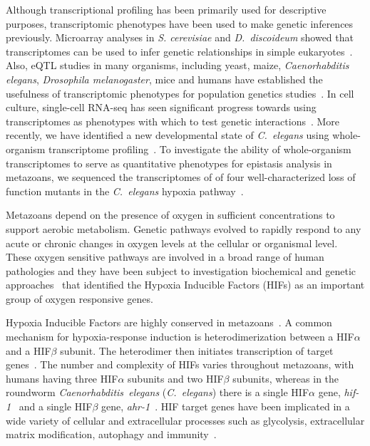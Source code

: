 \documentclass[9pt,twocolumn,twoside]{pnas-new}
\newcommand{\cel}{\emph{C.~elegans}}
\newcommand{\dicty}{\emph{D.~discoideum}}
\newcommand{\gene}[1]{\emph{#1}}
\begin{document}
Although transcriptional profiling has been primarily used for descriptive purposes,
transcriptomic phenotypes have been used to make genetic inferences previously.
Microarray analyses in \emph{S. cerevisiae} and \dicty{} showed
that transcriptomes can be used to infer genetic relationships in simple
eukaryotes~\cite{Hughes2000, VanDriessche2005}. Also, eQTL studies in
many organisms, including yeast, maize, \emph{Caenorhabditis elegans},
\emph{Drosophila melanogaster}, mice and humans have established the usefulness of
transcriptomic phenotypes for population genetics studies~\cite{Brem2002,Schadt2003,
Li2006,King2014}. In cell culture, single-cell RNA-seq has seen significant
progress towards using transcriptomes as phenotypes with which to test genetic
interactions~\cite{Adamson2016,Dixit2016}.
More recently, we have identified a new developmental state
of \cel{} using whole-organism transcriptome profiling~\cite{Angeles-Albores2016a}.
To investigate the ability of whole-organism transcriptomes to serve as quantitative
phenotypes for epistasis analysis in metazoans, we sequenced the transcriptomes of
of four well-characterized loss of function mutants in the \cel{} hypoxia
pathway~\cite{Epstein2001,Shen2006,Shao2009,Jiang2001}.

Metazoans depend on the presence of oxygen in sufficient concentrations to
support aerobic metabolism. Genetic pathways evolved to rapidly respond to any
acute or chronic changes in oxygen levels at the cellular or organismal level.
These oxygen sensitive pathways are involved in a broad range of human
pathologies and they have been subject to investigation biochemical and
genetic approaches~\cite{Semenza2012} that identified the Hypoxia
Inducible Factors (HIFs) as an important group of oxygen responsive genes.

Hypoxia Inducible Factors are highly conserved in metazoans~\cite{Loenarz2011}.
A common mechanism for hypoxia-response induction is heterodimerization between a
HIF$\alpha$ and a HIF$\beta$ subunit. The heterodimer then initiates
transcription of target genes~\cite{Jiang1996}. The number and complexity of HIFs varies
throughout metazoans, with humans having three HIF$\alpha$ subunits and two
HIF$\beta$ subunits, whereas in the roundworm \emph{Caenorhabditis~elegans}
(\cel{}) there is a single HIF$\alpha$ gene, \gene{hif-1}~\cite{Jiang2001} and a single HIF$\beta$
gene, \gene{ahr-1}~\cite{Powell-Coffman1998}. HIF target genes have been implicated
in a wide variety of cellular and extracellular processes such as glycolysis,
extracellular matrix modification, autophagy and immunity~\cite{Semenza1994,
Bishop2004,Shen2005,Bellier2009,Semenza2012}.
\end{document}
